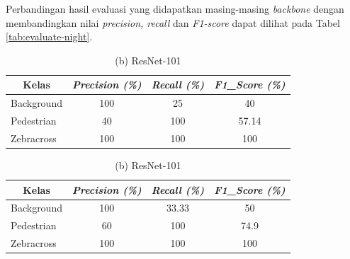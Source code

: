 Perbandingan hasil evaluasi yang didapatkan masing-masing \textit{backbone} dengan membandingkan nilai \textit{precision, recall} dan \textit{F1-score} dapat dilihat pada Tabel \ref{tab:evaluate-night}.

\begin{table}[H]
	\centering
	\caption{{Perbandingan Hasil Evaluasi pada Malam Hari}}
	\begin{minipage}[b]{\textwidth}
		\centering
		\caption*{(a) ResNet-50}
		\begin{tabular}{|l|c|c|c|}
			\hline
			\multicolumn{1}{|c|}{\textbf{Kelas}} & \textit{\textbf{Precision (\%)}} & \textit{\textbf{Recall (\%)}} & \textit{\textbf{F1\_Score (\%)}} \\ \hline
			Background                           & 100                              & 25                            & 40                               \\ \hline
			Pedestrian                           & 40                               & 100                           & 57.14                            \\ \hline
			Zebracross                           & 100                              & 100                           & 100                              \\ \hline
			
		\end{tabular}	
		
	\end{minipage}
	\vfill
	\begin{minipage}[b]{\textwidth}
		\centering
		\caption*{(b) ResNet-101}
		\begin{tabular}{|l|c|c|c|}
			\hline
			\multicolumn{1}{|c|}{\textbf{Kelas}} & \textit{\textbf{Precision (\%)}} & \textit{\textbf{Recall (\%)}} & \textit{\textbf{F1\_Score (\%)}} \\ \hline
			Background                           & 100                              & 33.33                         & 50                               \\ \hline
			Pedestrian                           & 60                               & 100                           & 74.9                             \\ \hline
			Zebracross                           & 100                              & 100                           & 100                              \\ \hline
			
		\end{tabular}
		

\end{minipage}
\end{table}
